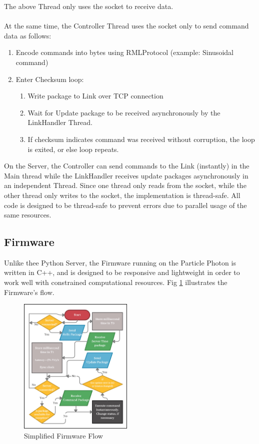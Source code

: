 \documentclass[letterpaper, 10 pt, conference]{ieeeconf}  %
\begin{document}
\noindent The above Thread only uses the socket to receive data. \\\\ At the same time, the Controller Thread uses the socket only to send command data as follows:

\begin{enumerate}
    \item Encode commands into bytes using RMLProtocol (example: Sinusoidal command)
    \item Enter Checksum loop:
    \begin{enumerate}
        \item Write package to Link over TCP connection
        \item Wait for Update package to be received asynchronously by the LinkHandler Thread.
        \item If checksum indicates command was received without corruption, the loop is exited, or else loop repeats.
    \end{enumerate}
\end{enumerate}

On the Server, the Controller can send commands to the Link (instantly) in the Main thread while the LinkHandler receives update packages asynchronously in an independent Thread. Since one thread only reads from the socket, while the other thread only writes to the socket, the implementation is thread-safe. All code is designed to be thread-safe to prevent errors due to parallel usage of the same resources.
\subsection{Firmware}

Unlike thee Python Server, the Firmware running on the Particle Photon is written in C++, and is designed to be responsive and lightweight in order to work well with constrained computational resources. Fig \ref{fig_firmware} illustrates the Firmware's flow.

\begin{figure}[H]
\centering
\includegraphics[width=0.485\textwidth]{media/Firmware.jpg}
   \caption{\label{fig_firmware} Simplified Firmware Flow}
\end{figure}
\end{document}
